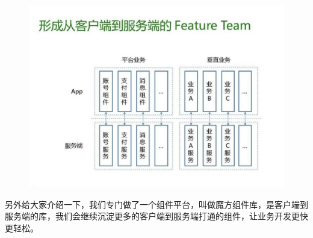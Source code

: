 \documentclass[12pt]{article}
\begin{document}
\begin{figure}[H]
    \centering
    \includegraphics[width=1\textwidth]{fig/DIDI_Reconstruction_22.png}
\end{figure}


另外给大家介绍一下，我们专门做了一个组件平台，叫做魔方组件库，是客户端到服务端的库，我们会继续沉淀更多的客户端到服务端打通的组件，让业务开发更快更轻松。





\end{document}
